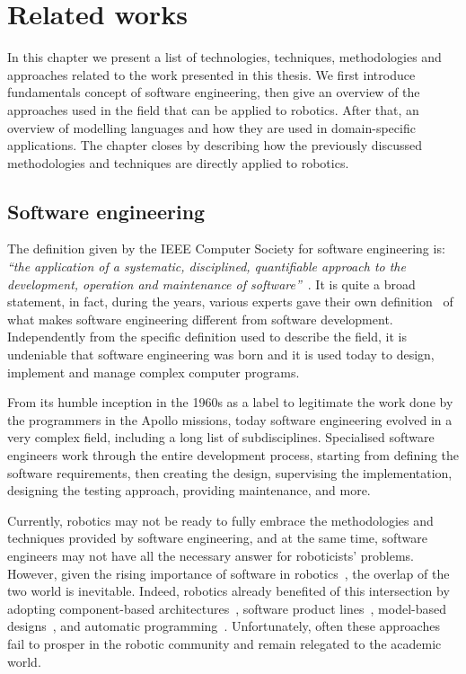 \chapter[Related works]{Related works}\label{ch:Related}

In this chapter we present a list of technologies, techniques, methodologies and approaches related to the work presented in this thesis. We first introduce fundamentals concept of software engineering, then give an overview of the approaches used in the field that can be applied to robotics. After that, an overview of modelling languages and how they are used in domain-specific applications. The chapter closes by describing how the previously discussed methodologies and techniques are directly applied to robotics.

\minitoc
\newpage

\section{Software engineering}
The definition given by the IEEE Computer Society for software engineering is: \textit{``the application of a systematic, disciplined, quantifiable approach to the development, operation and maintenance of software''}~\cite{abran2004software}. It is quite a broad statement, in fact, during the years, various experts gave their own definition~\cite{sommerville2011software, ieee1990ieee, pressman2005software} of what makes software engineering different from software development. Independently from the specific definition used to describe the field, it is undeniable that software engineering was born and it is used today to design, implement and manage complex computer programs.

From its humble inception in the 1960s as a label to legitimate the work done by the programmers in the Apollo missions, today software engineering evolved in a very complex field, including a long list of subdisciplines. Specialised software engineers work through the entire development process, starting from defining the software requirements, then creating the design, supervising the implementation, designing the testing approach, providing maintenance, and more.

Currently, robotics may not be ready to fully embrace the methodologies and techniques provided by software engineering, and at the same time, software engineers may not have all the necessary answer for roboticists' problems. However, given the rising importance of software in robotics~\cite{cousins2011exponential}, the overlap of the two world is inevitable. Indeed, robotics already benefited of this intersection by adopting component-based architectures~\cite{quigley2009ros, schlegel2014smartmdsd}, software product lines~\cite{gherardi2014modeling}, model-based designs~\cite{diego2010v3cmm}, and automatic programming~\cite{kumar2016rosmod}. Unfortunately, often these approaches fail to prosper in the robotic community and remain relegated to the academic world.

